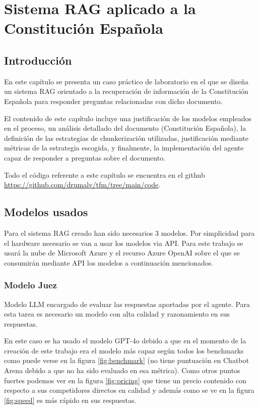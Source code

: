 
\cleardoublepage

\chapter{Sistema RAG aplicado a la Constitución Española}

\section{Introducción}

En este capítulo se presenta un caso práctico de laboratorio en el que se diseña un sistema RAG orientado a la recuperación de información de la Constitución Española para responder preguntas relacionadas con dicho documento.

El contenido de este capítulo incluye una justificación de los modelos empleados en el proceso, un análisis detallado del documento (Constitución Española), la definición de las estrategias de chunkerización utilizadas, justificación mediante métricas de la estrategia escogida, y finalmente, la implementación del agente capaz de responder a preguntas sobre el documento.

Todo el código referente a este capítulo se encuentra en el github \url{https://github.com/drumalv/tfm/tree/main/code}.


\section{Modelos usados}

Para el sistema RAG creado han sido necesarios 3 modelos. Por simplicidad para el hardware necesario se van a usar los modelos via API. Para este trabajo se usará la nube de Microsoft Azure y el recurso Azure OpenAI sobre el que se consumirán mediante API los modelos a continuación mencionados.

\subsection{Modelo Juez}

Modelo LLM encargado de evaluar las respuestas aportadas por el agente. Para esta tarea es necesario un modelo con alta calidad y razonamiento en sus respuestas.

En este caso se ha usado el modelo GPT-4o debido a que en el momento de la creación de este trabajo era el modelo más capaz según todos los benchmarks como puede verse en la figura \ref{fig:benchmark} (no tiene puntuación en Chatbot Arena debido a que no ha sido evaluado en esa métrica). Como otros puntos fuertes podemos ver en la figura \ref{fig:pricing} que tiene un precio contenido con respecto a sus competidores directos en calidad y además como se ve en la figura \ref{fig:speed} es más rápido en sus respuestas.

